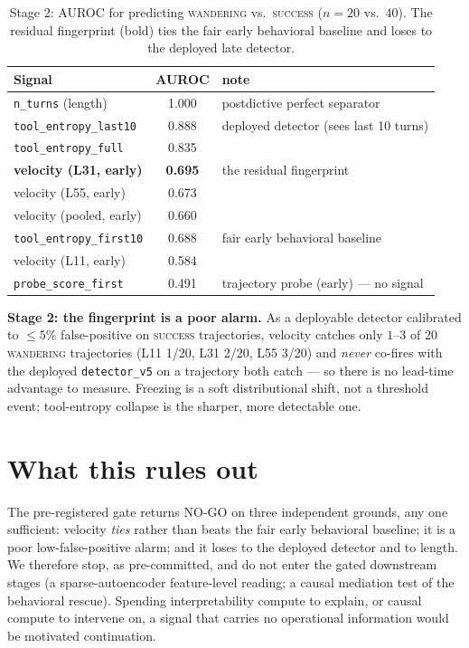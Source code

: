 \documentclass[11pt]{article}
\begin{document}
\begin{table}[h]
\centering
\caption{Stage 2: AUROC for predicting \textsc{wandering} vs.\ \textsc{success} ($n=20$ vs.\ $40$). The residual fingerprint (bold) ties the fair early behavioral baseline and loses to the deployed late detector.}
\label{tab:auroc}
\begin{tabular}{lcl}
\toprule
Signal & AUROC & note \\
\midrule
\texttt{n\_turns} (length) & 1.000 & postdictive perfect separator \\
\texttt{tool\_entropy\_last10} & 0.888 & deployed detector (sees last 10 turns) \\
\texttt{tool\_entropy\_full} & 0.835 & \\
\textbf{velocity (L31, early)} & \textbf{0.695} & the residual fingerprint \\
velocity (L55, early) & 0.673 & \\
velocity (pooled, early) & 0.660 & \\
\texttt{tool\_entropy\_first10} & 0.688 & fair early behavioral baseline \\
velocity (L11, early) & 0.584 & \\
\texttt{probe\_score\_first} & 0.491 & trajectory probe (early) --- no signal \\
\bottomrule
\end{tabular}
\end{table}

\textbf{Stage 2: the fingerprint is a poor alarm.} As a deployable detector calibrated to $\le 5\%$ false-positive on \textsc{success} trajectories, velocity catches only $1$--$3$ of $20$ \textsc{wandering} trajectories (L11 1/20, L31 2/20, L55 3/20) and \emph{never} co-fires with the deployed \texttt{detector\_v5} on a trajectory both catch --- so there is no lead-time advantage to measure. Freezing is a soft distributional shift, not a threshold event; tool-entropy collapse is the sharper, more detectable one.

\section{What this rules out}\label{sec:ruleout}

The pre-registered gate returns NO-GO on three independent grounds, any one sufficient: velocity \emph{ties} rather than beats the fair early behavioral baseline; it is a poor low-false-positive alarm; and it loses to the deployed detector and to length. We therefore stop, as pre-committed, and do not enter the gated downstream stages (a sparse-autoencoder feature-level reading; a causal mediation test of the behavioral rescue). Spending interpretability compute to explain, or causal compute to intervene on, a signal that carries no operational information would be motivated continuation.
\end{document}
